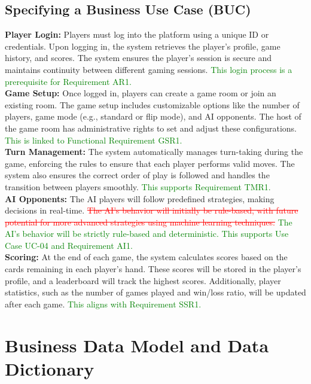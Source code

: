 \documentclass[12pt]{article}
\newcommand{\removed}[1]{\textcolor{red}{\sout{#1}}}
\newcommand{\added}[1]{\textcolor{green}{#1}}
\begin{document}
\subsection{Specifying a Business Use Case (BUC)}

\textbf{Player Login:} Players must log into the platform using a unique ID or credentials. Upon logging in, the system retrieves the player's profile, game history, and scores. The system ensures the player's session is secure and maintains continuity between different gaming sessions. \added{This login process is a prerequisite for Requirement AR1.} \\

\textbf{Game Setup:} Once logged in, players can create a game room or join an existing room. The game setup includes customizable options like the number of players, game mode (e.g., standard or flip mode), and AI opponents. The host of the game room has administrative rights to set and adjust these configurations. \added{This is linked to Functional Requirement GSR1.} \\

\textbf{Turn Management:} The system automatically manages turn-taking during the game, enforcing the rules to ensure that each player performs valid moves. The system also ensures the correct order of play is followed and handles the transition between players smoothly. \added{This supports Requirement TMR1.} \\

\textbf{AI Opponents:} The AI players will follow predefined strategies, making decisions in real-time. \removed{The AI’s behavior will initially be rule-based, with future potential for more advanced strategies using machine learning techniques.} \added{The AI’s behavior will be strictly rule-based and deterministic.} \added{This supports Use Case UC-04 and Requirement AI1.} \\

\textbf{Scoring:} At the end of each game, the system calculates scores based on the cards remaining in each player's hand. These scores will be stored in the player's profile, and a leaderboard will track the highest scores. Additionally, player statistics, such as the number of games played and win/loss ratio, will be updated after each game. \added{This aligns with Requirement SSR1.}

\section{Business Data Model and Data Dictionary}
\end{document}
